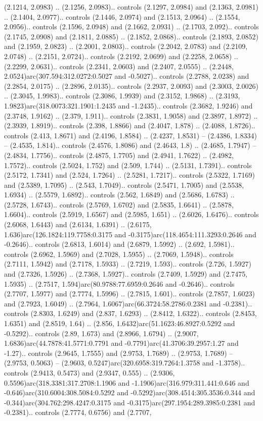 (2.1214, 2.0983) .. (2.1256, 2.0983).. controls (2.1297, 2.0984) and (2.1363, 2.0981) .. (2.1404, 2.0977).. controls (2.1446, 2.0974) and (2.1513, 2.0964) .. (2.1554, 2.0956).. controls (2.1596, 2.0948) and (2.1662, 2.0931) .. (2.1703, 2.092).. controls (2.1745, 2.0908) and (2.1811, 2.0885) .. (2.1852, 2.0868).. controls (2.1893, 2.0852) and (2.1959, 2.0823) .. (2.2001, 2.0803).. controls (2.2042, 2.0783) and (2.2109, 2.0748) .. (2.2151, 2.0724).. controls (2.2192, 2.0699) and (2.2258, 2.0658) .. (2.2299, 2.0631).. controls (2.2341, 2.0603) and (2.2407, 2.0555) .. (2.2448, 2.0524)arc(307.594:312.0272:0.5027 and -0.5027).. controls (2.2788, 2.0238) and (2.2854, 2.0175) .. (2.2896, 2.0135).. controls (2.2937, 2.0093) and (2.3003, 2.0026) .. (2.3045, 1.9983).. controls (2.3086, 1.9939) and (2.3152, 1.9868) .. (2.3193, 1.9823)arc(318.0073:321.1901:1.2435 and -1.2435).. controls (2.3682, 1.9246) and (2.3748, 1.9162) .. (2.379, 1.911).. controls (2.3831, 1.9058) and (2.3897, 1.8972) .. (2.3939, 1.8919).. controls (2.398, 1.8866) and (2.4047, 1.878) .. (2.4088, 1.8726).. controls (2.413, 1.8671) and (2.4196, 1.8584) .. (2.4237, 1.8531) -- (2.4386, 1.8334) -- (2.4535, 1.814).. controls (2.4576, 1.8086) and (2.4643, 1.8) .. (2.4685, 1.7947) -- (2.4834, 1.7756).. controls (2.4875, 1.7705) and (2.4941, 1.7622) .. (2.4982, 1.7572).. controls (2.5024, 1.752) and (2.509, 1.744) .. (2.5131, 1.7391).. controls (2.5172, 1.7341) and (2.524, 1.7264) .. (2.5281, 1.7217).. controls (2.5322, 1.7169) and (2.5389, 1.7095) .. (2.543, 1.7049).. controls (2.5471, 1.7005) and (2.5538, 1.6934) .. (2.5579, 1.6892).. controls (2.562, 1.6849) and (2.5686, 1.6783) .. (2.5728, 1.6743).. controls (2.5769, 1.6702) and (2.5835, 1.6641) .. (2.5878, 1.6604).. controls (2.5919, 1.6567) and (2.5985, 1.651) .. (2.6026, 1.6476).. controls (2.6068, 1.6443) and (2.6134, 1.6391) .. (2.6175, 1.636)arc(126.1824:119.7758:0.3175 and -0.3175)arc(118.4654:111.3293:0.2646 and -0.2646).. controls (2.6813, 1.6014) and (2.6879, 1.5992) .. (2.692, 1.5981).. controls (2.6962, 1.5969) and (2.7028, 1.5955) .. (2.7069, 1.5948).. controls (2.7111, 1.5942) and (2.7178, 1.5933) .. (2.7219, 1.593).. controls (2.726, 1.5927) and (2.7326, 1.5926) .. (2.7368, 1.5927).. controls (2.7409, 1.5929) and (2.7475, 1.5935) .. (2.7517, 1.594)arc(80.9788:77.6959:0.2646 and -0.2646).. controls (2.7707, 1.5977) and (2.7774, 1.5996) .. (2.7815, 1.601).. controls (2.7857, 1.6023) and (2.7923, 1.6049) .. (2.7964, 1.6067)arc(66.3724:58.2786:0.2381 and -0.2381).. controls (2.8303, 1.6249) and (2.837, 1.6293) .. (2.8412, 1.6322).. controls (2.8453, 1.6351) and (2.8519, 1.64) .. (2.856, 1.6432)arc(51.1623:46.8927:0.5292 and -0.5292).. controls (2.89, 1.673) and (2.8966, 1.6794) .. (2.9007, 1.6836)arc(44.7878:41.5771:0.7791 and -0.7791)arc(41.3706:39.2957:1.27 and -1.27).. controls (2.9645, 1.7555) and (2.9753, 1.7689) .. (2.9753, 1.7689) -- (2.9753, 0.5063) -- (2.9603, 0.5247)arc(320.6958:319.7264:1.3758 and -1.3758).. controls (2.9413, 0.5473) and (2.9347, 0.555) .. (2.9306, 0.5596)arc(318.3381:317.2708:1.1906 and -1.1906)arc(316.979:311.441:0.646 and -0.646)arc(310.6004:308.5084:0.5292 and -0.5292)arc(308.4514:305.3536:0.344 and -0.344)arc(304.762:298.4247:0.3175 and -0.3175)arc(297.1954:289.3985:0.2381 and -0.2381).. controls (2.7774, 0.6756) and (2.7707, 